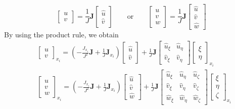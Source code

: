 \documentclass{article}
\begin{document}
\begin{equation*}
\begin{bmatrix} u \\ v \end{bmatrix} = \frac{1}{J}\mathbf{J}\begin{bmatrix} \widehat{u} \\ \widehat{v} \end{bmatrix}
\qquad\text{or}\qquad
\begin{bmatrix} u \\ v \\ w \end{bmatrix} = \frac{1}{J}\mathbf{J}\begin{bmatrix} \widehat{u} \\ \widehat{v} \\ \widehat{w} \end{bmatrix}
\end{equation*}
By using the product rule, we obtain
\begin{subequations}
\begin{align}
&\begin{bmatrix} u \\ v \end{bmatrix}_{x_i} = \left(-\frac{J_{x_i}}{J^2}\mathbf{J}+\frac{1}{J}\mathbf{J}_{x_i}\right)\begin{bmatrix} \widehat{u} \\ \widehat{v} \end{bmatrix} + \frac{1}{J}\mathbf{J}\begin{bmatrix} \widehat{u}_{\xi} & \widehat{u}_{\eta} \\ \widehat{v}_{\xi} & \widehat{v}_{\eta} \end{bmatrix}\begin{bmatrix} \xi \\ \eta \end{bmatrix}_{x_i} \\
&\begin{bmatrix} u \\ v \\ w \end{bmatrix}_{x_i} = \left(-\frac{J_{x_i}}{J^2}\mathbf{J}+\frac{1}{J}\mathbf{J}_{x_i}\right)\begin{bmatrix} \widehat{u} \\ \widehat{v} \\ \widehat{w} \end{bmatrix} + \frac{1}{J}\mathbf{J}\begin{bmatrix} \widehat{u}_{\xi} & \widehat{u}_{\eta} & \widehat{u}_{\zeta} \\ \widehat{v}_{\xi} & \widehat{v}_{\eta} & \widehat{v}_{\zeta} \\ \widehat{w}_{\xi} & \widehat{w}_{\eta} & \widehat{w}_{\zeta} \end{bmatrix}\begin{bmatrix} \xi \\ \eta \\ \zeta \end{bmatrix}_{x_i}
\end{align}
\end{subequations}
%
%
\end{document}
